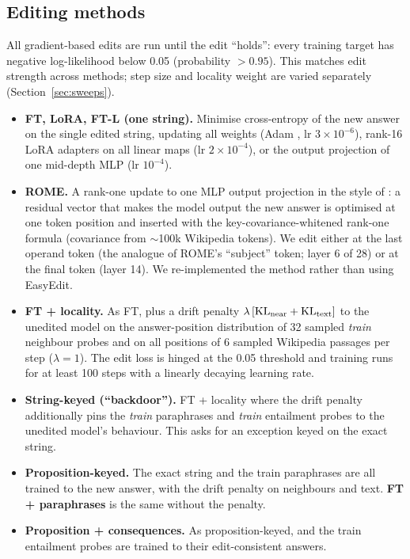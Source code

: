 \subsection{Editing methods}
\label{sec:methods}
All gradient-based edits are run until the edit ``holds'': every training target has negative log-likelihood below 0.05 (probability $>0.95$). This matches edit strength across methods; step size and locality weight are varied separately (Section~\ref{sec:sweeps}).

\begin{itemize}\setlength\itemsep{1pt}
\item \textbf{FT, LoRA, FT-L (one string).} Minimise cross-entropy of the new answer on the single edited string, updating all weights (Adam \citep{kingma2015adam}, lr $3\times10^{-6}$), rank-16 LoRA adapters on all linear maps \citep{hu2022lora} (lr $2\times10^{-4}$), or the output projection of one mid-depth MLP (lr $10^{-4}$).
\item \textbf{ROME.} A rank-one update to one MLP output projection in the style of \citet{meng2022rome}: a residual vector that makes the model output the new answer is optimised at one token position and inserted with the key-covariance-whitened rank-one formula (covariance from $\sim$100k Wikipedia tokens). We edit either at the last operand token (the analogue of ROME's ``subject'' token; layer 6 of 28) or at the final token (layer 14). We re-implemented the method rather than using EasyEdit.
\item \textbf{FT + locality.} As FT, plus a drift penalty $\lambda\,[\mathrm{KL}_\text{near}+\mathrm{KL}_\text{text}]$ to the unedited model on the answer-position distribution of 32 sampled \emph{train} neighbour probes and on all positions of 6 sampled Wikipedia passages per step ($\lambda=1$). The edit loss is hinged at the 0.05 threshold and training runs for at least 100 steps with a linearly decaying learning rate.
\item \textbf{String-keyed (``backdoor'').} FT + locality where the drift penalty additionally pins the \emph{train} paraphrases and \emph{train} entailment probes to the unedited model's behaviour. This asks for an exception keyed on the exact string.
\item \textbf{Proposition-keyed.} The exact string and the train paraphrases are all trained to the new answer, with the drift penalty on neighbours and text. \textbf{FT + paraphrases} is the same without the penalty.
\item \textbf{Proposition + consequences.} As proposition-keyed, and the train entailment probes are trained to their edit-consistent answers.

\end{itemize}
